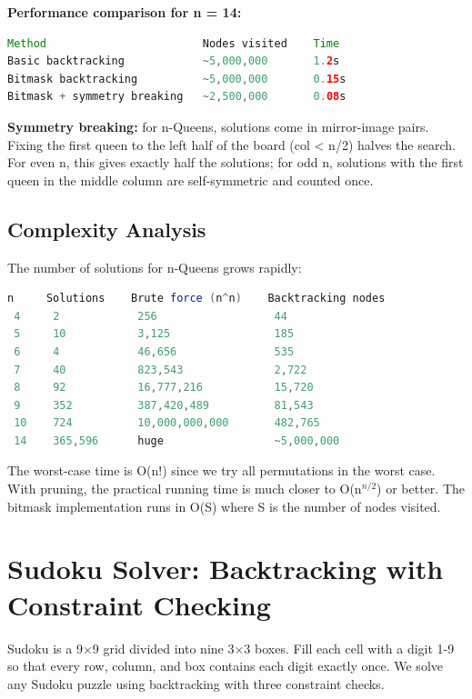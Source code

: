 \textbf{Performance comparison for n = 14:}

\begin{lstlisting}[language=Java]
Method                        Nodes visited    Time
Basic backtracking            ~5,000,000       1.2s
Bitmask backtracking          ~5,000,000       0.15s
Bitmask + symmetry breaking   ~2,500,000       0.08s
\end{lstlisting}

\textbf{Symmetry breaking:} for n-Queens, solutions come in mirror-image pairs. Fixing the first queen to the left half of the board (col < n/2) halves the search. For even n, this gives exactly half the solutions; for odd n, solutions with the first queen in the middle column are self-symmetric and counted once.

\subsection{Complexity Analysis}

The number of solutions for n-Queens grows rapidly:

\begin{lstlisting}[language=Java]
 n     Solutions    Brute force (n^n)    Backtracking nodes
 4     2            256                  44
 5     10           3,125                185
 6     4            46,656               535
 7     40           823,543              2,722
 8     92           16,777,216           15,720
 9     352          387,420,489          81,543
 10    724          10,000,000,000       482,765
 14    365,596      huge                 ~5,000,000
\end{lstlisting}

The worst-case time is O(n!) since we try all permutations in the worst case. With pruning, the practical running time is much closer to O(n$^{n/2}$) or better. The bitmask implementation runs in O(S) where S is the number of nodes visited.

\section{Sudoku Solver: Backtracking with Constraint Checking}\label{sec:sudoku-solver}

Sudoku is a 9$\times $9 grid divided into nine 3$\times $3 boxes. Fill each cell with a digit 1-9 so that every row, column, and box contains each digit exactly once. We solve any Sudoku puzzle using backtracking with three constraint checks.

